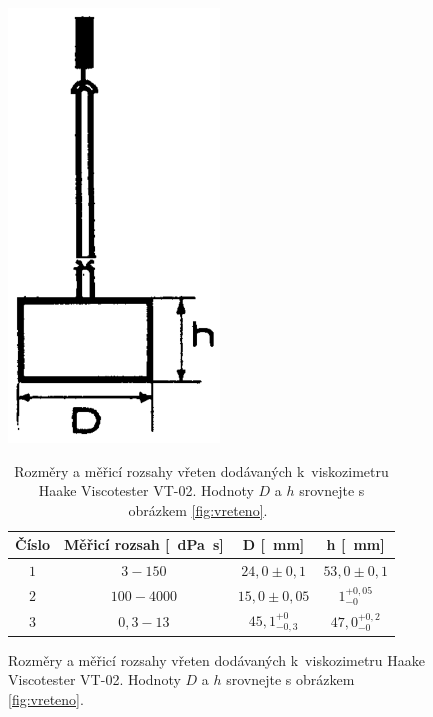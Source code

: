 \documentclass[12pt]{article}
\begin{document}
\begin{figure}[ht]
    \begin{minipage}[b]{0.3\linewidth}
        \centering
        \includegraphics[width=0.5\textwidth]{figures/vreteno.png}
        \caption{Obecný nákres rotačního vřetena.~\cite{man:VT-02}}
        \label{fig:vreteno}
    \end{minipage}
    \hspace{0.5cm}
    \begin{minipage}[b]{0.65\linewidth}
        \begin{table}[H]
            \centering
            \begin{tabular}{|c|c|c|c|}
                \hline
                Číslo & Měřicí rozsah [\SI{}{\deci\pascal\second}] & D [\SI{}{\milli\metre}] & h [\SI{}{\milli\metre}] \\ \hline
                $1$ & $3 - 150$ & $24,0\pm 0,1$ & $53,0\pm0,1$ \\ \hline
                $2$ & $100 - 4000$ & $15,0\pm 0,05$ & $1^{+0,05}_{-0}$ \\ \hline
                $3$ & $0,3 - 13$ & $45,1^{+0}_{-0,3}$ & $47,0^{+0,2}_{-0}$ \\ \hline
            \end{tabular}
            \caption{Rozměry a měřicí rozsahy vřeten dodávaných k~viskozimetru Haake Viscotester VT-02. Hodnoty $D$ a $h$ srovnejte s obrázkem \ref{fig:vreteno}.~\cite{man:VT-02}}
            \label{tab:vretena}
        \end{table}
        \label{fig:figure2}
    \end{minipage}
\end{figure}
\end{document}
